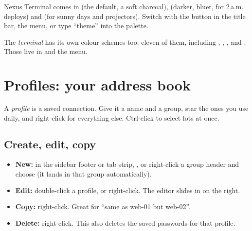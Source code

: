 Nexus Terminal comes in  (the default, a soft charcoal),  (darker, bluer, for 2\,a.m.
deploys) and  (for sunny days and projectors). Switch with the \iBulb{} button in the title bar, the
 menu, or type ``theme'' into the palette.


The \emph{terminal} has its own colour schemes too: eleven of them, including , ,
,  and . Those live in  and the  menu.


\chapter{Profiles: your address book}\label{ch:profiles}

\begin{tldr}
A \emph{profile} is a saved connection. Give it a name and a group, star the ones you use daily, and
right-click for everything else. Ctrl-click to select lots at once.
\end{tldr}

\section{Create, edit, copy}

\begin{itemize}
  \item \textbf{New:} \ui{+} in the sidebar footer or tab strip, , or right-click a group header and choose
         (it lands in that group automatically).
  \item \textbf{Edit:} double-click a profile, or right-click\then{}. The editor slides in on the right.
  \item \textbf{Copy:} right-click\then{}. Great for ``same as web-01 but web-02''.
  \item \textbf{Delete:} right-click\then{}. This also deletes the saved passwords for that profile.
\end{itemize}

